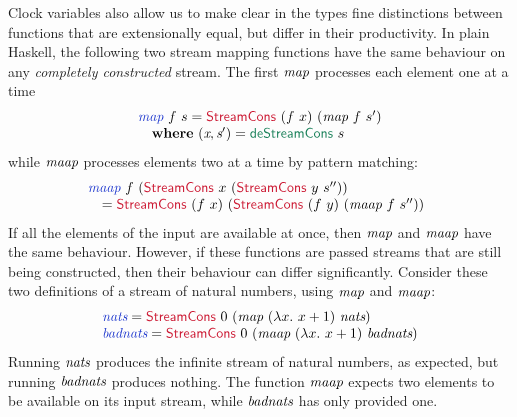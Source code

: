 Clock variables also allow us to make clear in the types fine
distinctions between functions that are extensionally equal, but
differ in their productivity. In plain Haskell, the following two
stream mapping functions have the same behaviour on any
\emph{completely constructed} stream. The first $\textit{map}$
processes each element one at a time
\begin{displaymath}
  \begin{array}{l}
    \defn{map}~f~s = \cons{StreamCons}~(f~x)~(\ident{map}~f~s') \\
    \quad \kw{where}~(\ident{x}, \ident{s$'$}) = \elim{deStreamCons}~s
  \end{array}
\end{displaymath}
while $\textit{maap}$ processes elements two at a time by pattern matching:
\begin{displaymath}
  \begin{array}{@{}l}
    \defn{maap}~f~(\cons{StreamCons}~x~(\cons{StreamCons}~y~s'')) \\
    \quad = \cons{StreamCons}~(f~x)~(\cons{StreamCons}~(f~y)~(\ident{maap}~f~s''))
  \end{array}
\end{displaymath}
If all the elements of the input are available at once, then
$\textit{map}$ and $\textit{maap}$ have the same behaviour. However, if
these functions are passed streams that are still being constructed,
then their behaviour can differ significantly. Consider these two
definitions of a stream of natural numbers, using $\textit{map}$ and $\textit{maap}$:
\begin{displaymath}
  \begin{array}{l}
    \defn{nats} = \cons{StreamCons}~0~(\ident{map}~(\lambda x.~x+1)~\ident{nats})\\
    \defn{badnats} = \cons{StreamCons}~0~(\ident{maap}~(\lambda x.~x+1)~\ident{badnats})
  \end{array}
\end{displaymath}
Running $\textit{nats}$ produces the infinite stream of natural
numbers, as expected, but running $\textit{badnats}$ produces
nothing. The function $\textit{maap}$ expects two elements to be
available on its input stream, while $\textit{badnats}$ has only
provided one.

